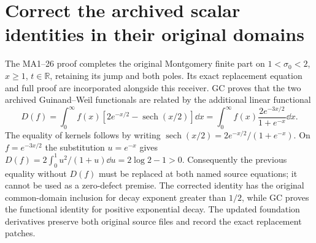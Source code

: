 \section{Correct the archived scalar identities in their original domains}
The MA1--26 proof completes the original Montgomery finite part on
$1<\sigma_0<2$, $x\ge1$, $t\in\mathbb R$, retaining its jump and both poles.
Its exact replacement equation and full proof are incorporated alongside
this receiver. GC proves that the two archived Guinand--Weil functionals
are related by the additional linear functional
\begin{equation}\tag{A3R13}
 D(f)=\int_0^\infty f(x)
 [2e^{-x/2}-\operatorname{sech}(x/2)]\dd x
 =\int_0^\infty f(x)\frac{2e^{-3x/2}}{1+e^{-x}}\dd x.
\end{equation}
The equality of kernels follows by writing
$\operatorname{sech}(x/2)=2e^{-x/2}/(1+e^{-x})$.
On $f=e^{-3x/2}$ the substitution $u=e^{-x}$ gives
$D(f)=2\int_0^1u^2/(1+u)\dd u=2\log2-1>0$.
Consequently the previous equality without $D(f)$ must be replaced at
both named source equations; it cannot be used as a zero-defect premise.
The corrected identity has the original common-domain inclusion for decay
exponent greater than $1/2$, while GC proves the functional identity for
positive exponential decay. The updated foundation derivatives preserve
both original source files and record the exact replacement patches.


\endgroup

\endgroup
